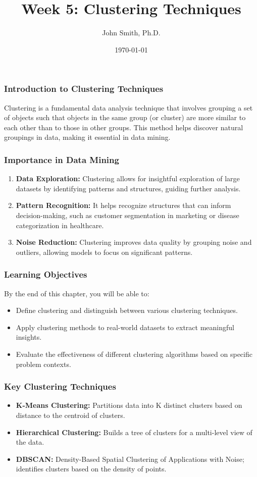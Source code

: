 \documentclass[aspectratio=169]{beamer}
\title[Clustering Techniques]{Week 5: Clustering Techniques}
\author[J. Smith]{John Smith, Ph.D.}
\institute[University Name]{
  Department of Computer Science\\
  University Name\\
  \vspace{0.3cm}
  Email: email@university.edu\\
  Website: www.university.edu
}
\date{\today}
\begin{document}
\frame{\titlepage}

\begin{frame}[fragile]
    \frametitle{Introduction to Clustering Techniques}
    Clustering is a fundamental data analysis technique that involves grouping a set of objects such that objects in the same group (or cluster) are more similar to each other than to those in other groups. This method helps discover natural groupings in data, making it essential in data mining.

\end{frame}

\begin{frame}[fragile]
    \frametitle{Importance in Data Mining}
    \begin{enumerate}
        \item \textbf{Data Exploration:} Clustering allows for insightful exploration of large datasets by identifying patterns and structures, guiding further analysis.
        \item \textbf{Pattern Recognition:} It helps recognize structures that can inform decision-making, such as customer segmentation in marketing or disease categorization in healthcare.
        \item \textbf{Noise Reduction:} Clustering improves data quality by grouping noise and outliers, allowing models to focus on significant patterns.
    \end{enumerate}
\end{frame}

\begin{frame}[fragile]
    \frametitle{Learning Objectives}
    By the end of this chapter, you will be able to:
    \begin{itemize}
        \item Define clustering and distinguish between various clustering techniques.
        \item Apply clustering methods to real-world datasets to extract meaningful insights.
        \item Evaluate the effectiveness of different clustering algorithms based on specific problem contexts.
    \end{itemize}
\end{frame}

\begin{frame}[fragile]
    \frametitle{Key Clustering Techniques}
    \begin{itemize}
        \item \textbf{K-Means Clustering:} Partitions data into K distinct clusters based on distance to the centroid of clusters.
        \item \textbf{Hierarchical Clustering:} Builds a tree of clusters for a multi-level view of the data.
        \item \textbf{DBSCAN:} Density-Based Spatial Clustering of Applications with Noise; identifies clusters based on the density of points.
    \end{itemize}
\end{frame}
\end{document}
